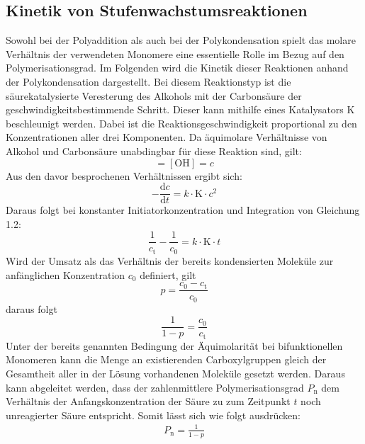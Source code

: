 \documentclass[12pt, bibliography=totocnumbered]{scrartcl}
\begin{document}
\subsection{Kinetik von Stufenwachstumsreaktionen}
Sowohl bei der Polyaddition als auch bei der Polykondensation spielt das molare Verhältnis der verwendeten Monomere eine essentielle Rolle im Bezug auf den Polymerisationsgrad. Im Folgenden wird die Kinetik dieser Reaktionen anhand der Polykondensation dargestellt. Bei diesem Reaktionstyp ist die säurekatalysierte Veresterung des Alkohols mit der Carbonsäure der geschwindigkeitsbestimmende Schritt. Dieser kann mithilfe eines Katalysators K beschleunigt werden. Dabei ist die Reaktionsgeschwindigkeit proportional zu den Konzentrationen aller drei Komponenten. Da äquimolare Verhältnisse von Alkohol und Carbonsäure unabdingbar für diese Reaktion sind, gilt:
\begin{equation}
[\mathrm{COOH}]=[\mathrm{OH}]=c    
\end{equation}
Aus den davor besprochenen Verhältnissen ergibt sich:
\begin{equation}
-\frac{\mathrm{d}c}{\mathrm{d}t}=k\cdot\mathrm{K}\cdot c^2    
\end{equation}
Daraus folgt bei konstanter Initiatorkonzentration und Integration von Gleichung 1.2:
\begin{equation}
\frac{\mathrm{1}}{c_\mathrm{t}}-\frac{\mathrm{1}}{c_\mathrm{0}}=k\cdot\mathrm{K}\cdot t
\end{equation}
Wird der Umsatz als das Verhältnis der bereits kondensierten Moleküle zur anfänglichen Konzentration $c_\mathrm{0}$ definiert, gilt
\begin{equation}
p=\frac{c_\mathrm{0}-c_\mathrm{t}}{c_\mathrm{0}}    
\end{equation}
daraus folgt
\begin{equation}
\frac{\mathrm{1}}{\mathrm{1}-p}=\frac{c_\mathrm{0}}{c_\mathrm{t}}    
\end{equation}
Unter der bereits genannten Bedingung der Äquimolarität bei bifunktionellen Monomeren kann die Menge an existierenden Carboxylgruppen gleich der Gesamtheit aller in der Lösung vorhandenen Moleküle gesetzt werden. Daraus kann abgeleitet werden, dass der zahlenmittlere Polymerisationsgrad $P_\mathrm{n}$ dem Verhältnis der Anfangskonzentration der Säure zu zum Zeitpunkt $t$ noch unreagierter Säure entspricht. Somit lässt sich wie folgt ausdrücken:
\begin{align}
    P_\text{n} = \frac{1}{1-p} 
    \label{eq:Carothers}
\end{align}
\end{document}
